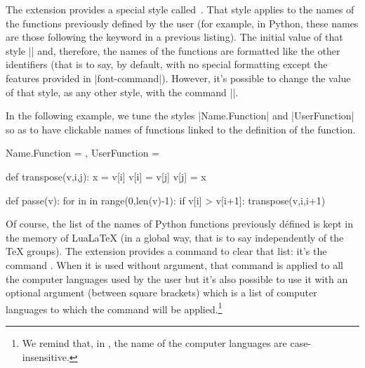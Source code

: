 \documentclass{article}
\begin{document}
The extension  provides a special style called~.
That style applies to the names of the functions previously defined by the user
(for example, in Python, these names are those following the keyword 
in a previous listing). The initial value of that style ||
and, therefore, the names of the functions are formatted like the other identifiers
(that is to say, by default, with no special formatting except the features provided
in |font-command|). However, it's possible to change the value of that style, as any
other style, with the command |\SetPitonStyle|.

\medskip
In the following example, we tune the styles |Name.Function| and |UserFunction|
so as to have clickable names of functions linked to the definition of the function.

\begingroup


\SetPitonStyle
  {
    Name.Function = \MyDefFunction ,
    UserFunction = \MyUserFunction
  }

\medskip
\begin{Code}
   {\hypertarget{piton:#1}{\color[HTML]{CC00FF}{#1}}}

\end{Code}

\smallskip

\begin{Piton}
def transpose(v,i,j):
    x = v[i]
    v[i] = v[j]
    v[j] = x 

def passe(v):
    for in in range(0,len(v)-1):
        if v[i] > v[i+1]:
            transpose(v,i,i+1)
\end{Piton}

\endgroup


\PitonClearUserFunctions[Python]

\bigskip
\begin{small}
Of course, the list of the names of Python functions previously défined is
kept in the memory of LuaLaTeX (in a global way, that is to say independently
of the TeX groups). The extension  provides a command to clear that
list: it's the command . When it
is used without argument, that command is applied to all the computer
languages used by the user but it's also possible to use it with an optional
argument (between square brackets) which is a list of computer languages to
which the command will be applied.\footnote{We remind that, in ,
the name of the computer languages are case-insensitive.}
\end{small}
\end{document}
